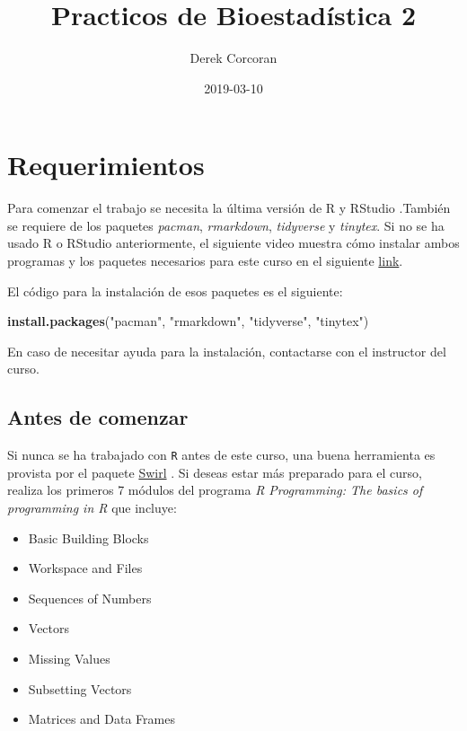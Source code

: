 \documentclass[]{book}
\title{Practicos de Bioestadística 2}
\author{Derek Corcoran}
\date{2019-03-10}
\newenvironment{Shaded}{\begin{snugshade}}{\end{snugshade}}
\newcommand{\KeywordTok}[1]{\textcolor[rgb]{0.13,0.29,0.53}{\textbf{#1}}}
\newcommand{\NormalTok}[1]{#1}
\newcommand{\StringTok}[1]{\textcolor[rgb]{0.31,0.60,0.02}{#1}}
\providecommand{\tightlist}{%
  \setlength{\itemsep}{0pt}\setlength{\parskip}{0pt}}
\begin{document}
\maketitle

{
\setcounter{tocdepth}{1}
\tableofcontents
}
\hypertarget{requerimientos}{%
\chapter*{Requerimientos}\label{requerimientos}}

Para comenzar el trabajo se necesita la última versión de R y RStudio \citep{R-base}.También se requiere de los paquetes \emph{pacman}, \emph{rmarkdown}, \emph{tidyverse} y \emph{tinytex}. Si no se ha usado R o RStudio anteriormente, el siguiente video muestra cómo instalar ambos programas y los paquetes necesarios para este curso en el siguiente \href{https://youtu.be/RtkCAKXsVbw}{link}.

El código para la instalación de esos paquetes es el siguiente:

\begin{Shaded}
\begin{Highlighting}[]
\KeywordTok{install.packages}\NormalTok{(}\StringTok{"pacman"}\NormalTok{, }\StringTok{"rmarkdown"}\NormalTok{, }\StringTok{"tidyverse"}\NormalTok{, }\StringTok{"tinytex"}\NormalTok{)}
\end{Highlighting}
\end{Shaded}

En caso de necesitar ayuda para la instalación, contactarse con el instructor del curso.

\hypertarget{antes-de-comenzar}{%
\section{Antes de comenzar}\label{antes-de-comenzar}}

Si nunca se ha trabajado con \texttt{R} antes de este curso, una buena herramienta es provista por el paquete \href{http://swirlstats.com/students.html}{Swirl} \citep{Kross2017}. Si deseas estar más preparado para el curso, realiza los primeros 7 módulos del programa \emph{R Programming: The basics of programming in R} que incluye:

\begin{itemize}
\tightlist
\item
  Basic Building Blocks
\item
  Workspace and Files
\item
  Sequences of Numbers
\item
  Vectors
\item
  Missing Values
\item
  Subsetting Vectors
\item
  Matrices and Data Frames
\end{itemize}
\end{document}
